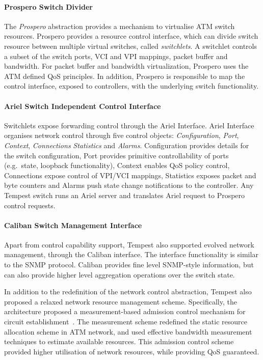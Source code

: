 \paragraph{Prospero Switch Divider} 

The \emph{Prospero} abstraction provides a mechanism to virtualise ATM switch
resources. Prospero provides a resource control interface, which can divide
switch resource between multiple virtual switches, called \emph{switchlets}.  A
switchlet controls a subset of the switch ports, VCI and VPI mappings, packet
buffer and bandwidth. For packet buffer and bandwidth virtualization, Prospero
uses the ATM defined QoS  principles. In addition, Prospero is responsible to
map the control interface, exposed to controllers, with the underlying switch
functionality. 

\paragraph{Ariel Switch Independent Control Interface} 

Switchlets expose forwarding control through the Ariel Interface. Ariel
Interface organises network control through five control objects:
\emph{Configuration}, \emph{Port}, \emph{Context}, {\it Connections}
\emph{Statistics} and \emph{Alarms}.  Configuration provides details for the
switch configuration, Port provides primitive controllability of ports
(e.g.~state, loopback functionality), Context enables QoS policy control,
Connections expose control of VPI/VCI mappings, Statistics exposes packet and
byte counters and Alarms push state change notifications to the controller. Any
Tempest switch runs an Ariel server and translates Ariel request to Prospero
control requests. 

\paragraph{Caliban Switch Management Interface}

Apart from control capability support, Tempest also supported evolved network
management, through the Caliban interface. The interface functionality is
similar to the SNMP protocol. Caliban provides fine level SNMP-style
information, but can also provide higher level aggregation operations over the
switch state. 

In addition to the redefinition of the network control abstraction, Tempest also
proposed a relaxed network resource management scheme.  Specifically, the
architecture proposed a measurement-based admission control mechanism for
circuit establishment~\cite{Lewis1998}. The measurement scheme redefined the
static resource allocation scheme in ATM network, and used effective bandwidth
measurement techniques to estimate available resources.  This admission control
scheme provided higher utilisation of network resources, while providing QoS
guaranteed. 

